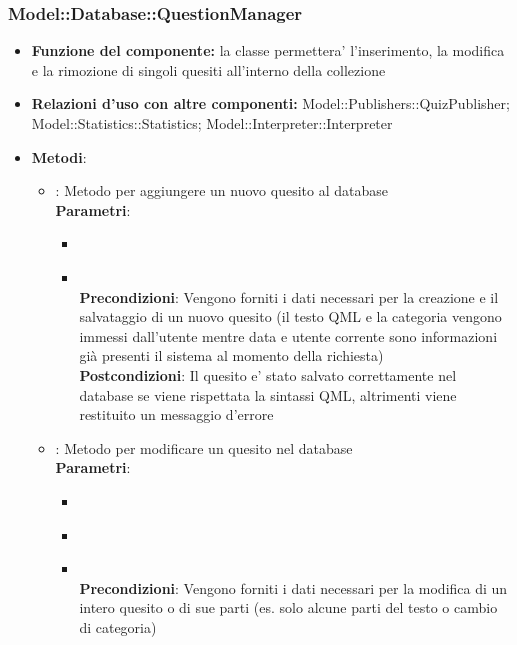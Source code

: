 \subsubsection{Model::Database::QuestionManager}
\begin{itemize}
\item\textbf{Funzione del componente:} la classe permettera' l'inserimento, la modifica e la rimozione di singoli quesiti all'interno della collezione
\item\textbf{Relazioni d'uso con altre componenti:} Model::Publishers::QuizPublisher; Model::Statistics::Statistics; Model::Interpreter::Interpreter\\
\item\textbf{Metodi}:
	\begin{itemize}
		\item{} : Metodo per aggiungere un nuovo quesito al database\\
		\textbf{Parametri}:
			\begin{itemize}
				\item{}\\
				\item{}\\
				\textbf{Precondizioni}: Vengono forniti i dati necessari per la creazione e il salvataggio di un nuovo quesito (il testo QML e la categoria vengono immessi dall'utente mentre data e utente corrente sono informazioni già presenti il sistema al momento della richiesta)\\
				\textbf{Postcondizioni}: Il quesito e' stato salvato correttamente nel database se viene rispettata la sintassi QML, altrimenti viene restituito un messaggio d'errore\\
			\end{itemize}
		\item{} : Metodo per modificare un quesito nel database\\
		\textbf{Parametri}:
			\begin{itemize}
				\item{}\\
				\item{}\\
				\item{}\\
				\textbf{Precondizioni}: Vengono forniti i dati necessari per la modifica di un intero quesito o di sue parti (es. solo alcune parti del testo o cambio di categoria)\\

\end{itemize}
\end{itemize}
\end{itemize}
